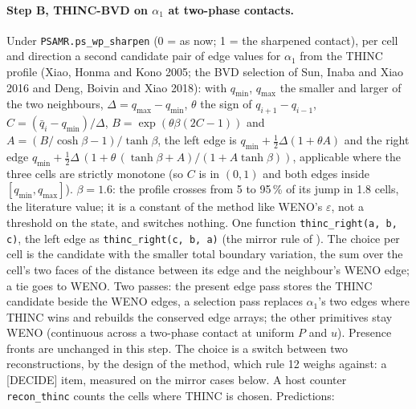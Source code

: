 \documentclass[11pt,a4paper]{article}
\newcommand{\code}[1]{\texttt{\small #1}}
\begin{document}
\paragraph{Step B, THINC-BVD on $\alpha_1$ at two-phase contacts.}
Under \code{PSAMR.ps\_wp\_sharpen} (0 = as now; 1 = the sharpened
contact), per cell and direction a second candidate pair of edge values
for $\alpha_1$ from the THINC profile (Xiao, Honma and Kono 2005; the
BVD selection of Sun, Inaba and Xiao 2016 and Deng, Boivin and Xiao
2018): with $q_{\min}$, $q_{\max}$ the smaller and larger of the two
neighbours, $\Delta = q_{\max} - q_{\min}$, $\theta$ the sign of
$q_{i+1} - q_{i-1}$, $C = (\bar q_i - q_{\min})/\Delta$,
$B = \exp(\theta\beta(2C-1))$ and $A = (B/\cosh\beta - 1)/\tanh\beta$,
the left edge is $q_{\min} + \tfrac12\Delta(1 + \theta A)$ and the right
edge $q_{\min} + \tfrac12\Delta\,(1 + \theta\,(\tanh\beta + A)/(1 + A\tanh\beta))$,
applicable where the three cells are strictly monotone (so $C$ is in
$(0,1)$ and both edges inside $[q_{\min}, q_{\max}]$).  $\beta = 1.6$:
the profile crosses from 5 to 95\,\% of its jump in 1.8 cells, the
literature value; it is a constant of the method like WENO's
$\varepsilon$, not a threshold on the state, and switches nothing.  One
function \code{thinc\_right(a, b, c)}, the left edge as
\code{thinc\_right(c, b, a)} (the mirror rule of ).  The
choice per cell is the candidate with the smaller total boundary
variation, the sum over the cell's two faces of the distance between its
edge and the neighbour's WENO edge; a tie goes to WENO.  Two passes: the
present edge pass stores the THINC candidate beside the WENO edges, a
selection pass replaces $\alpha_1$'s two edges where THINC wins and
rebuilds the conserved edge arrays; the other primitives stay WENO
(continuous across a two-phase contact at uniform $P$ and $u$).
Presence fronts are unchanged in this step.  The choice is a switch
between two reconstructions, by the design of the method, which rule 12
weighs against: a [DECIDE] item, measured on the mirror cases below.
A host counter \code{recon\_thinc} counts the cells where THINC is
chosen.  Predictions:
\end{document}
